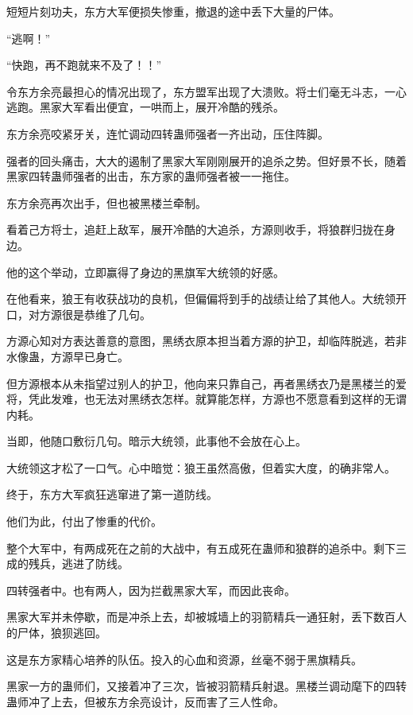
\begin{this_body}

短短片刻功夫，东方大军便损失惨重，撤退的途中丢下大量的尸体。

“逃啊！”

“快跑，再不跑就来不及了！！”

令东方余亮最担心的情况出现了，东方盟军出现了大溃败。将士们毫无斗志，一心逃跑。黑家大军看出便宜，一哄而上，展开冷酷的残杀。

东方余亮咬紧牙关，连忙调动四转蛊师强者一齐出动，压住阵脚。

强者的回头痛击，大大的遏制了黑家大军刚刚展开的追杀之势。但好景不长，随着黑家四转蛊师强者的出击，东方家的蛊师强者被一一拖住。

东方余亮再次出手，但也被黑楼兰牵制。

看着己方将士，追赶上敌军，展开冷酷的大追杀，方源则收手，将狼群归拢在身边。

他的这个举动，立即赢得了身边的黑旗军大统领的好感。

在他看来，狼王有收获战功的良机，但偏偏将到手的战绩让给了其他人。大统领开口，对方源很是恭维了几句。

方源心知对方表达善意的意图，黑绣衣原本担当着方源的护卫，却临阵脱逃，若非水像蛊，方源早已身亡。

但方源根本从未指望过别人的护卫，他向来只靠自己，再者黑绣衣乃是黑楼兰的爱将，凭此发难，也无法对黑绣衣怎样。就算能怎样，方源也不愿意看到这样的无谓内耗。

当即，他随口敷衍几句。暗示大统领，此事他不会放在心上。

大统领这才松了一口气。心中暗觉：狼王虽然高傲，但着实大度，的确非常人。

终于，东方大军疯狂逃窜进了第一道防线。

他们为此，付出了惨重的代价。

整个大军中，有两成死在之前的大战中，有五成死在蛊师和狼群的追杀中。剩下三成的残兵，逃进了防线。

四转强者中。也有两人，因为拦截黑家大军，而因此丧命。

黑家大军并未停歇，而是冲杀上去，却被城墙上的羽箭精兵一通狂射，丢下数百人的尸体，狼狈逃回。

这是东方家精心培养的队伍。投入的心血和资源，丝毫不弱于黑旗精兵。

黑家一方的蛊师们，又接着冲了三次，皆被羽箭精兵射退。黑楼兰调动麾下的四转蛊师冲了上去，但被东方余亮设计，反而害了三人性命。


\end{this_body}
